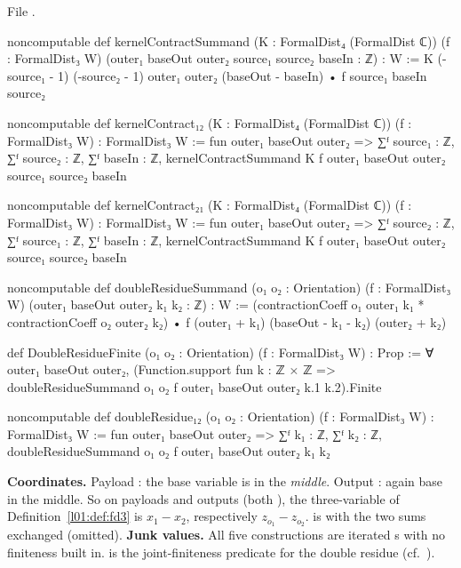 \noindent File .
\begin{leancode}
noncomputable def kernelContractSummand (K : FormalDist₄ (FormalDist ℂ))
    (f : FormalDist₃ W) (outer₁ baseOut outer₂ source₁ source₂ baseIn : ℤ) : W :=
  K (-source₁ - 1) (-source₂ - 1) outer₁ outer₂ (baseOut - baseIn) •
    f source₁ baseIn source₂

noncomputable def kernelContract₁₂ (K : FormalDist₄ (FormalDist ℂ))
    (f : FormalDist₃ W) : FormalDist₃ W :=
  fun outer₁ baseOut outer₂ => ∑ᶠ source₁ : ℤ, ∑ᶠ source₂ : ℤ, ∑ᶠ baseIn : ℤ,
    kernelContractSummand K f outer₁ baseOut outer₂ source₁ source₂ baseIn

noncomputable def kernelContract₂₁ (K : FormalDist₄ (FormalDist ℂ))
    (f : FormalDist₃ W) : FormalDist₃ W :=
  fun outer₁ baseOut outer₂ => ∑ᶠ source₂ : ℤ, ∑ᶠ source₁ : ℤ, ∑ᶠ baseIn : ℤ,
    kernelContractSummand K f outer₁ baseOut outer₂ source₁ source₂ baseIn

noncomputable def doubleResidueSummand (o₁ o₂ : Orientation) (f : FormalDist₃ W)
    (outer₁ baseOut outer₂ k₁ k₂ : ℤ) : W :=
  (contractionCoeff o₁ outer₁ k₁ * contractionCoeff o₂ outer₂ k₂) •
    f (outer₁ + k₁) (baseOut - k₁ - k₂) (outer₂ + k₂)

def DoubleResidueFinite (o₁ o₂ : Orientation) (f : FormalDist₃ W) : Prop :=
  ∀ outer₁ baseOut outer₂,
    (Function.support fun k : ℤ × ℤ =>
      doubleResidueSummand o₁ o₂ f outer₁ baseOut outer₂ k.1 k.2).Finite

noncomputable def doubleResidue₁₂ (o₁ o₂ : Orientation) (f : FormalDist₃ W) :
    FormalDist₃ W :=
  fun outer₁ baseOut outer₂ => ∑ᶠ k₁ : ℤ, ∑ᶠ k₂ : ℤ,
    doubleResidueSummand o₁ o₂ f outer₁ baseOut outer₂ k₁ k₂
\end{leancode}

\begin{dictionary}
\textbf{Coordinates.} Payload : the base variable is in the \emph{middle}. Output
: again base in the middle. So on payloads and outputs (both ),
the three-variable  of Definition~\ref{l01:def:fd3} is $x_1-x_2$, respectively $z_{o_1}-z_{o_2}$.
 is  with the two sums exchanged (omitted).
\textbf{Junk values.} All five constructions are iterated s with no finiteness built in.
 is the joint-finiteness predicate for the double residue (cf.\ ).
\end{dictionary}

